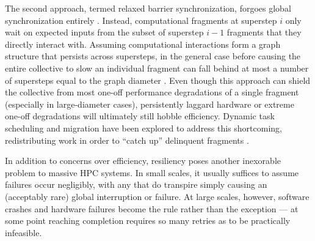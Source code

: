 The second approach, termed relaxed barrier synchronization, forgoes global synchronization entirely \citep{kim1998relaxed}.
Instead, computational fragments at superstep $i$ only wait on expected inputs from the subset of superstep $i-1$ fragments that they directly interact with.
Assuming computational interactions form a graph structure that persists across supersteps, in the general case before causing the entire collective to slow an individual fragment can fall behind at most a number of supersteps equal to the graph diameter \citep{gamell2015local}.
Even though this approach can shield the collective from most one-off performance degradations of a single fragment (especially in large-diameter cases), persistently laggard hardware or extreme one-off degradations will ultimately still hobble efficiency.
Dynamic task scheduling and migration have been explored to address this shortcoming, redistributing work in order to ``catch up'' delinquent fragments \citep{acun2014parallel}.

In addition to concerns over efficiency, resiliency poses another inexorable problem to massive HPC systems.
In small scales, it usually suffices to assume failures occur negligibly, with any that do transpire simply causing an (acceptably rare) global interruption or failure.
At large scales, however, software crashes and hardware failures become the rule rather than the exception \citep{dongarra2014applied} --- at some point reaching completion requires so many retries as to be practically infeasible.

